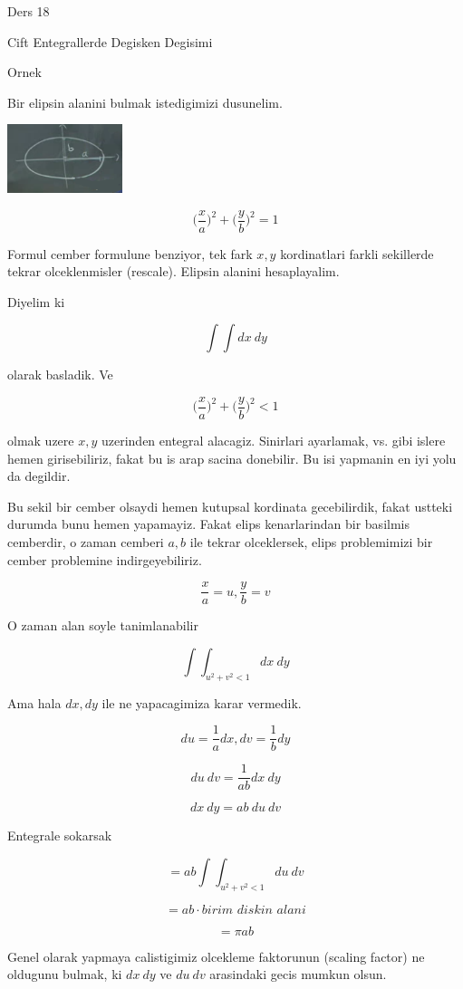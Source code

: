 \documentclass[12pt,fleqn]{article}\usepackage{../common}
\begin{document}
Ders 18

Cift Entegrallerde Degisken Degisimi 

Ornek 

Bir elipsin alanini bulmak istedigimizi dusunelim. 

\includegraphics[height=2cm]{18_1.png}

\[ \bigg(\frac{x}{a}\bigg)^2 + \bigg(\frac{y}{b}\bigg)^2 = 1 \]

Formul cember formulune benziyor, tek fark $x,y$ kordinatlari farkli
sekillerde tekrar olceklenmisler (rescale). Elipsin alanini hesaplayalim. 

Diyelim ki 

\[ \int \int dx \ dy \]

olarak basladik. Ve

\[ \bigg(\frac{x}{a}\bigg)^2 + \bigg(\frac{y}{b}\bigg)^2 < 1 \]

olmak uzere $x,y$ uzerinden entegral alacagiz. Sinirlari ayarlamak,
vs. gibi islere hemen girisebiliriz, fakat bu is arap sacina donebilir. Bu
isi yapmanin en iyi yolu da degildir. 

Bu sekil bir cember olsaydi hemen kutupsal kordinata gecebilirdik, fakat
ustteki durumda bunu hemen yapamayiz. Fakat elips kenarlarindan bir basilmis
cemberdir, o zaman cemberi $a,b$ ile tekrar olceklersek, elips problemimizi
bir cember problemine indirgeyebiliriz. 

\[ \frac{x}{a} = u, \frac{y}{b} = v \]

O zaman alan soyle tanimlanabilir 

\[ \int \int_{u^2 + v^2 < 1} dx \ dy \]

Ama hala $dx,dy$ ile ne yapacagimiza karar vermedik. 

\[ du = \frac{1}{a}dx,dv = \frac{1}{b}dy \]

\[ du \ dv = \frac{1}{ab}dx \ dy \]

\[ dx \ dy = ab \ du \ dv \]

Entegrale sokarsak

\[ = ab \int \int_{u^2 + v^2 < 1} du \ dv \]

\[ = ab \cdot \textit{birim diskin alani} \]

\[ = \pi ab \]

Genel olarak yapmaya calistigimiz olcekleme faktorunun (scaling factor) ne
oldugunu bulmak, ki $dx \ dy$ ve $du \ dv$ arasindaki gecis mumkun olsun. 
\end{document}
